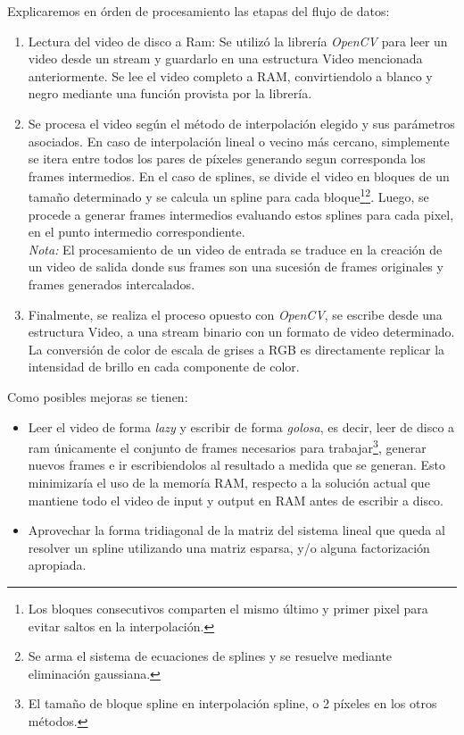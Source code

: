 Explicaremos en órden de procesamiento las etapas del flujo de datos:
\begin{enumerate}
	\item Lectura del video de disco a Ram: Se utilizó la librería \emph{OpenCV} para leer un video desde un stream y guardarlo en una estructura Video mencionada anteriormente. Se lee el video completo a RAM, convirtiendolo a blanco y negro mediante una función provista por la librería.
	\item Se procesa el video según el método de interpolación elegido y sus parámetros asociados. En caso de interpolación lineal o vecino más cercano, simplemente se itera entre todos los pares de píxeles generando segun corresponda los frames intermedios. En el caso de splines, se divide el video en bloques de un tamaño determinado y se calcula un spline para cada bloque\footnote{Los bloques consecutivos comparten el mismo último y primer pixel para evitar saltos en la interpolación.}\footnote{Se arma el sistema de ecuaciones de splines y se resuelve mediante eliminación gaussiana.}. Luego, se procede a generar frames intermedios evaluando estos splines para cada pixel, en el punto intermedio correspondiente.\\
	\emph{Nota:} El procesamiento de un video de entrada se traduce en la creación de un video de salida donde sus frames son una sucesión de frames originales y frames generados intercalados.
	\item Finalmente, se realiza el proceso opuesto con \emph{OpenCV}, se escribe desde una estructura Video, a una stream binario con un formato de video determinado. La conversión de color de escala de grises a RGB es directamente replicar la intensidad de brillo en cada componente de color.
\end{enumerate}

Como posibles mejoras se tienen:
\begin{itemize}
	 \item Leer el video de forma \emph{lazy} y escribir de forma \emph{golosa}, es decir, leer de disco a ram únicamente el conjunto de frames necesarios para trabajar\footnote{El tamaño de bloque spline en interpolación spline, o 2 píxeles en los otros métodos.}, generar nuevos frames e ir escribiendolos al resultado a medida que se generan. Esto minimizaría el uso de la memoría RAM, respecto a la solución actual que mantiene todo el video de input y output en RAM antes de escribir a disco. 

	 \item Aprovechar la forma tridiagonal de la matriz del sistema lineal que queda al resolver un spline utilizando una matriz esparsa, y/o alguna factorización apropiada. 
\end{itemize}




